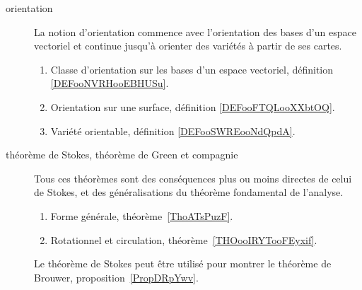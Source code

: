 
\begin{description}
	\item[orientation]
	      La notion d'orientation commence avec l'orientation des bases d'un espace vectoriel et continue jusqu'à orienter des variétés à partir de ses cartes.
	      \begin{enumerate}
		      \item
		            Classe d'orientation sur les bases d'un espace vectoriel, définition \ref{DEFooNVRHooEBHUSu}.
		      \item
		            Orientation sur une surface, définition \ref{DEFooFTQLooXXbtOQ}.
		      \item
		            Variété orientable, définition \ref{DEFooSWREooNdQpdA}.
	      \end{enumerate}
	\item[théorème de Stokes, théorème de Green et compagnie]
	      Tous ces théorèmes sont des conséquences plus ou moins directes de celui de Stokes, et des généralisations du théorème fondamental de l'analyse.
	      \begin{enumerate}
		      \item
		            Forme générale, théorème~\ref{ThoATsPuzF}.
		      \item
		            Rotationnel et circulation, théorème~\ref{THOooIRYTooFEyxif}.
	      \end{enumerate}
	      Le théorème de Stokes peut être utilisé pour montrer le théorème de Brouwer, proposition~\ref{PropDRpYwv}.
\end{description}
